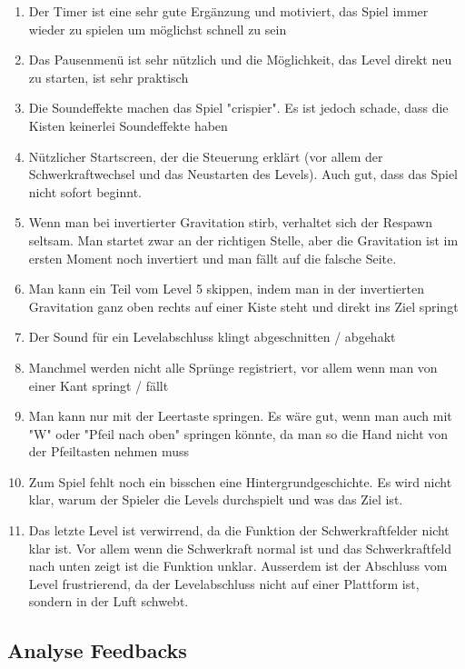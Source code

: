 \documentclass{article}
\begin{document}
\begin{enumerate}
    \item Der Timer ist eine sehr gute Ergänzung und motiviert, das Spiel immer wieder zu spielen um möglichst schnell zu sein
    \item Das Pausenmenü ist sehr nützlich und die Möglichkeit, das Level direkt neu zu starten, ist sehr praktisch
    \item Die Soundeffekte machen das Spiel "crispier". Es ist jedoch schade, dass die Kisten keinerlei Soundeffekte haben
    \item Nützlicher Startscreen, der die Steuerung erklärt (vor allem der Schwerkraftwechsel und das Neustarten des Levels). Auch gut, dass das Spiel nicht sofort beginnt.
    \item Wenn man bei invertierter Gravitation stirb, verhaltet sich der Respawn seltsam. Man startet zwar an der richtigen Stelle, aber die Gravitation ist im ersten Moment noch invertiert
    und man fällt auf die falsche Seite.
    \item Man kann ein Teil vom Level 5 skippen, indem man in der invertierten Gravitation ganz oben rechts auf einer Kiste steht und direkt ins Ziel springt
    \item Der Sound für ein Levelabschluss klingt abgeschnitten / abgehakt
    \item Manchmel werden nicht alle Sprünge registriert, vor allem wenn man von einer Kant springt / fällt
    \item Man kann nur mit der Leertaste springen. Es wäre gut, wenn man auch mit "W" oder "Pfeil nach oben" springen könnte, da man so die Hand nicht von der Pfeiltasten nehmen muss
    \item Zum Spiel fehlt noch ein bisschen eine Hintergrundgeschichte. Es wird nicht klar, warum der Spieler die Levels durchspielt und was das Ziel ist.
    \item Das letzte Level ist verwirrend, da die Funktion der Schwerkraftfelder nicht klar ist. Vor allem wenn die Schwerkraft normal ist und das Schwerkraftfeld nach unten zeigt ist die Funktion unklar.
    Ausserdem ist der Abschluss vom Level frustrierend, da der Levelabschluss nicht auf einer Plattform ist, sondern in der Luft schwebt.
\end{enumerate}

\subsection{Analyse Feedbacks}
\end{document}
